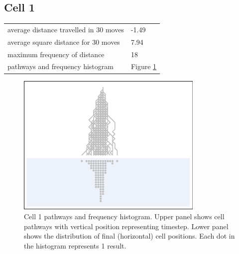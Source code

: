 \documentclass[11pt,a4paper]{article}
\newcommand \bt{\begin{longtable}{p{0.65\textwidth}p{0.25\textwidth}}}
\newcommand \et{\end{longtable}}
\begin{document}
\subsection*{Cell 1}
\bt
average distance travelled in 30 moves &  -1.49\\
average square distance for 30 moves & 7.94\\
maximum frequency of distance & 18\\
pathways and frequency histogram & Figure \ref{fig1}
\et
\begin{figure}[htbp]
\begin{center}
\includegraphics[width=0.8\textwidth]{CA30_R40L40_1.eps}
\caption{Cell 1 pathways and frequency histogram. Upper panel shows cell pathways with vertical position representing timestep. 
Lower panel shows the distribution of final (horizontal) cell positions. Each dot in the histogram represents 1 result.}
\label{fig1}
\end{center}
\end{figure}
\end{document}
